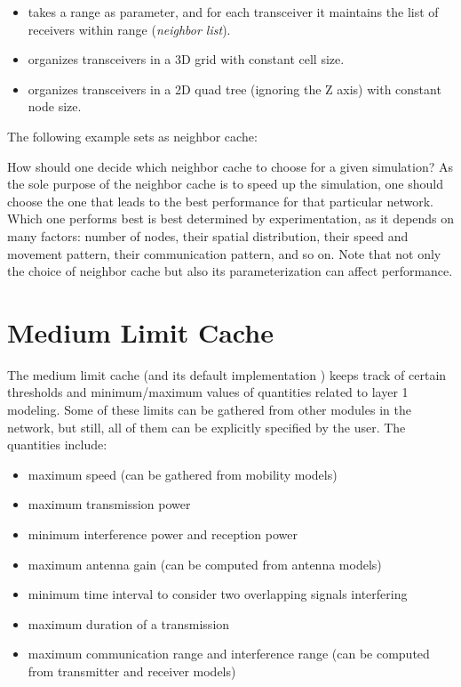 \begin{itemize}
  \item {} takes a range as parameter,
    and for each transceiver it maintains the list of receivers within
    range (\textit{neighbor list}).
  \item {} organizes transceivers in a 3D grid with 
    constant cell size.
  \item {} organizes transceivers in a 2D quad tree
    (ignoring the Z axis) with constant node size.
\end{itemize}

The following example sets  as neighbor cache:


How should one decide which neighbor cache to choose for a given simulation? 
As the sole purpose of the neighbor cache is to speed up the simulation, 
one should choose the one that leads to the best performance for that particular
network. Which one performs best is best determined by experimentation, as it
depends on many factors: number of nodes, their spatial distribution, their
speed and movement pattern, their communication pattern, and so on. 
Note that not only the choice of neighbor cache but also its parameterization
can affect performance.


\section{Medium Limit Cache}

The medium limit cache (and its default implementation )
keeps track of certain thresholds and minimum/maximum values of quantities 
related to layer 1 modeling. Some of these limits can be gathered from other 
modules in the network, but still, all of them can be explicitly specified by the user. 
The quantities include:

\begin{itemize}
    \item maximum speed (can be gathered from mobility models)
    \item maximum transmission power
    \item minimum interference power and reception power
    \item maximum antenna gain (can be computed from antenna models)
    \item minimum time interval to consider two overlapping signals interfering
    \item maximum duration of a transmission
    \item maximum communication range and interference range 
      (can be computed from transmitter and receiver models)
\end{itemize}

